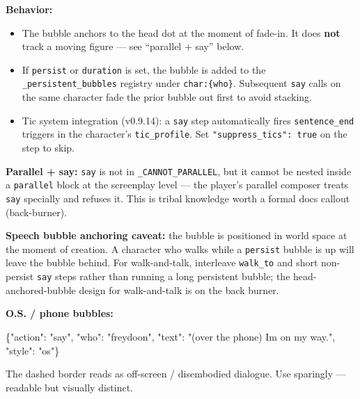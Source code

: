 \documentclass[
  11pt,
]{book}
\newenvironment{Shaded}{}{}
\newcommand{\DataTypeTok}[1]{\textcolor[rgb]{0.56,0.13,0.00}{#1}}
\newcommand{\FunctionTok}[1]{\textcolor[rgb]{0.02,0.16,0.49}{#1}}
\newcommand{\StringTok}[1]{\textcolor[rgb]{0.25,0.44,0.63}{#1}}
\providecommand{\tightlist}{%
  \setlength{\itemsep}{0pt}\setlength{\parskip}{0pt}}
\begin{document}
\textbf{Behavior:}

\begin{itemize}
\tightlist
\item
  The bubble anchors to the head dot at the moment of fade-in. It does
  \textbf{not} track a moving figure --- see ``parallel + say'' below.
\item
  If \texttt{persist} or \texttt{duration} is set, the bubble is added
  to the \texttt{\_persistent\_bubbles} registry under
  \texttt{char:\{who\}}. Subsequent \texttt{say} calls on the same
  character fade the prior bubble out first to avoid stacking.
\item
  Tic system integration (v0.9.14): a \texttt{say} step automatically
  fires \texttt{sentence\_end} triggers in the character's
  \texttt{tic\_profile}. Set \texttt{"suppress\_tics":\ true} on the
  step to skip.
\end{itemize}

\textbf{Parallel + say:} \texttt{say} is not in
\texttt{\_CANNOT\_PARALLEL}, but it cannot be nested inside a
\texttt{parallel} block at the screenplay level --- the player's
parallel composer treats \texttt{say} specially and refuses it. This is
tribal knowledge worth a formal docs callout (back-burner).

\textbf{Speech bubble anchoring caveat:} the bubble is positioned in
world space at the moment of creation. A character who walks while a
\texttt{persist} bubble is up will leave the bubble behind. For
walk-and-talk, interleave \texttt{walk\_to} and short non-persist
\texttt{say} steps rather than running a long persistent bubble; the
head-anchored-bubble design for walk-and-talk is on the back burner.

\textbf{O.S. / phone bubbles:}

\begin{Shaded}
\begin{Highlighting}[]
\FunctionTok{\{}\DataTypeTok{"action"}\FunctionTok{:} \StringTok{"say"}\FunctionTok{,} \DataTypeTok{"who"}\FunctionTok{:} \StringTok{"freydoon"}\FunctionTok{,}
 \DataTypeTok{"text"}\FunctionTok{:} \StringTok{"(over the phone) I\textquotesingle{}m on my way."}\FunctionTok{,} \DataTypeTok{"style"}\FunctionTok{:} \StringTok{"os"}\FunctionTok{\}}
\end{Highlighting}
\end{Shaded}

The dashed border reads as off-screen / disembodied dialogue. Use
sparingly --- readable but visually distinct.
\end{document}
